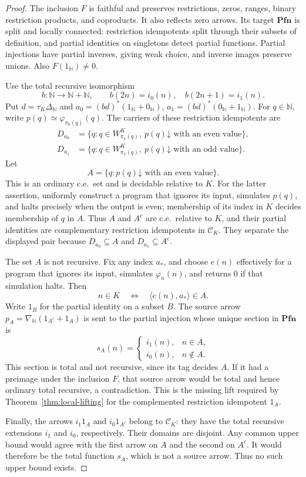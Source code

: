 \documentclass[11pt]{article}
\newcommand{\N}{\mathbb N}
\newcommand{\Pfn}{\mathbf{Pfn}}
\begin{document}
\begin{proof}
The inclusion $F$ is faithful and preserves restrictions, zeros,
ranges, binary restriction products, and coproducts. It also reflects
zero arrows. Its target $\Pfn$ is split and locally connected:
restriction idempotents split through their subsets of definition,
and partial identities on singletons detect partial functions.
Partial injections have partial inverses, giving weak choice, and
inverse images preserve unions. Also $F(1_{\N})\ne0$.

Use the total recursive isomorphism
\[
 b:\N\longrightarrow\N+\N,\qquad
 b(2n)=i_0(n),\quad b(2n+1)=i_1(n).
\]
Put $d=\tau_K\Delta_{\N}$ and
$a_0=(bd)^*(1_{\N}+0_{\N})$,
$a_1=(bd)^*(0_{\N}+1_{\N})$.
For $q\in\N$, write
$p(q)\simeq\varphi_{\pi_0(q)}(q)$. The carriers of these restriction idempotents are
\[
 \begin{aligned}
 D_{a_0}&=\{q:q\in W_{\pi_1(q)}^K,
                    \ p(q)\mathord\downarrow\text{ with an even value}\},\\
 D_{a_1}&=\{q:q\in W_{\pi_1(q)}^K,
                    \ p(q)\mathord\downarrow\text{ with an odd value}\}.
 \end{aligned}
\]
Let
\[
 A=\{q:p(q)\mathord\downarrow\text{ with an even value}\}.
\]
This is an ordinary c.e.\ set and is decidable relative to $K$.
For the latter assertion, uniformly construct a program that ignores
its input, simulates $p(q)$, and halts precisely when the output is
even; membership of its index in $K$ decides membership of $q$ in $A$.
Thus $A$ and $A^c$ are c.e.\ relative to $K$, and their partial
identities are complementary restriction idempotents in $\mathcal C_K$.
They separate the displayed pair because
$D_{a_0}\subseteq A$ and $D_{a_1}\subseteq A^c$.

The set $A$ is not recursive. Fix any index $a_*$, and choose $e(n)$
effectively for a program that ignores its input, simulates
$\varphi_n(n)$, and returns $0$ if that simulation halts. Then
\[
 n\in K\quad\Longleftrightarrow\quad
 \langle e(n),a_*\rangle\in A.
\]
Write $1_B$ for the partial identity on a subset $B$. The source
arrow $p_A=\nabla_{\N}(1_{A^c}+1_A)$ is sent to the partial
injection whose unique section in $\Pfn$ is
\[
 s_A(n)=
 \begin{cases}
  i_1(n),&n\in A,\\
  i_0(n),&n\notin A.
 \end{cases}
\]
This section is total and not recursive, since its tag decides $A$.
If it had a preimage under the inclusion $F$, that source arrow would
be total and hence ordinary total recursive, a contradiction.
This is the missing lift required by
Theorem~\ref{thm:local-lifting} for the complemented restriction idempotent $1_A$.

Finally, the arrows $i_1 1_A$ and $i_0 1_{A^c}$ belong to
$\mathcal C_K$: they have the total recursive extensions $i_1$
and $i_0$, respectively. Their domains are disjoint. Any common
upper bound would agree with the first arrow on $A$ and the second
on $A^c$. It would therefore be the total function $s_A$, which
is not a source arrow. Thus no such upper bound exists.
\end{proof}
\end{document}

